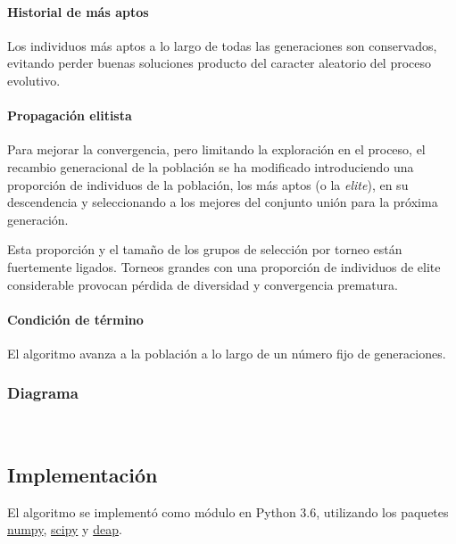 \documentclass[11pt, journal]{IEEEtran}
\begin{document}
\paragraph{Historial de más aptos}

Los individuos más aptos a lo largo de todas las generaciones son
conservados, evitando perder buenas soluciones producto del caracter
aleatorio del proceso evolutivo.

\paragraph{Propagación elitista}

Para mejorar la convergencia, pero limitando la exploración en el
proceso, el recambio generacional de la población se ha modificado
introduciendo una proporción de individuos de la población, los más
aptos (o la \emph{elite}), en su descendencia y seleccionando a los
mejores del conjunto unión para la próxima generación.

Esta proporción y el tamaño de los grupos de selección por torneo están
fuertemente ligados. Torneos grandes con una proporción de individuos de
elite considerable provocan pérdida de diversidad y convergencia
prematura.

\paragraph{Condición de término}

El algoritmo avanza a la población a lo largo de un número fijo de
generaciones.

\pagebreak

\subsubsection{Diagrama}

    
    \begin{center}
    \end{center}
    { \hspace*{\fill} \\}
    

    \subsection{Implementación}

El algoritmo se implementó como módulo en Python 3.6, utilizando los
paquetes \href{https://www.numpy.org/}{numpy},
\href{https://scipy.org/}{scipy} y
\href{https://deap.readthedocs.io/en/master/}{deap}.
\end{document}
